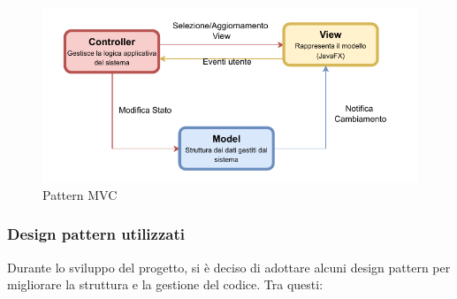 \documentclass[a4paper]{article}
\begin{document}
\begin{figure}[H]
    \centering
    \includegraphics[textwidth]{./figures/mvc_template}
    \caption{Pattern MVC}
    \label{fig:mvc_template}
\end{figure}

\subsubsection{Design pattern utilizzati}
Durante lo sviluppo del progetto, si è deciso di adottare alcuni design pattern per migliorare la struttura e la gestione del codice. Tra questi:
\end{document}
